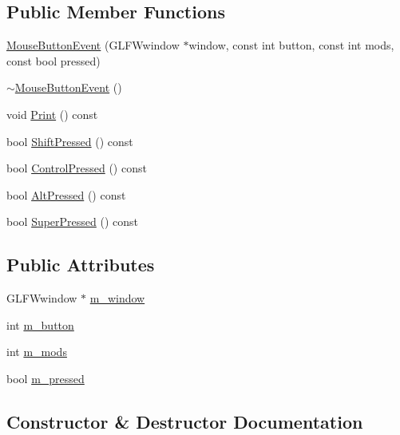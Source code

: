 \subsection*{Public Member Functions}
\begin{DoxyCompactItemize}
\item 
\mbox{\hyperlink{structngl_1_1_mouse_button_event_a842da60617a2abd66fc9447801f14e06}{Mouse\+Button\+Event}} (G\+L\+F\+Wwindow $\ast$window, const int button, const int mods, const bool pressed)
\item 
\mbox{\hyperlink{structngl_1_1_mouse_button_event_a5ecd52a5d43eb5c1c180760d4dd3fd94}{$\sim$\+Mouse\+Button\+Event}} ()
\item 
void \mbox{\hyperlink{structngl_1_1_mouse_button_event_aec79a0c4143f1dc7af731850832f32a8}{Print}} () const
\item 
bool \mbox{\hyperlink{structngl_1_1_mouse_button_event_a282f74df70d379bb87fb97558eb95179}{Shift\+Pressed}} () const
\item 
bool \mbox{\hyperlink{structngl_1_1_mouse_button_event_a62b2eabdb2570caffd84e35b3fe351e3}{Control\+Pressed}} () const
\item 
bool \mbox{\hyperlink{structngl_1_1_mouse_button_event_a0c03942d98edb9f17ca4c65fd67354d1}{Alt\+Pressed}} () const
\item 
bool \mbox{\hyperlink{structngl_1_1_mouse_button_event_a2d190c5489e70d0bb3dbf7ce0c350945}{Super\+Pressed}} () const
\end{DoxyCompactItemize}
\subsection*{Public Attributes}
\begin{DoxyCompactItemize}
\item 
G\+L\+F\+Wwindow $\ast$ \mbox{\hyperlink{structngl_1_1_mouse_button_event_ae292ba915083215131055f3a6c9b0d7f}{m\+\_\+window}}
\item 
int \mbox{\hyperlink{structngl_1_1_mouse_button_event_ac8834fcd8fb94c23cf1c4faf1949ca57}{m\+\_\+button}}
\item 
int \mbox{\hyperlink{structngl_1_1_mouse_button_event_aa05d0043b86bfb06e2ef3078c7d1ddf4}{m\+\_\+mods}}
\item 
bool \mbox{\hyperlink{structngl_1_1_mouse_button_event_a7306ba3f96ab4b05f94e89eb888c689a}{m\+\_\+pressed}}
\end{DoxyCompactItemize}


\subsection{Constructor \& Destructor Documentation}
\mbox{\label{structngl_1_1_mouse_button_event_a842da60617a2abd66fc9447801f14e06}} 
